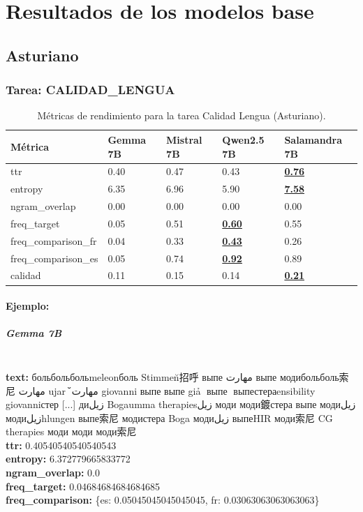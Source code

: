 \chapter{Resultados de los modelos base}

\section{Asturiano}

\subsection{Tarea: CALIDAD\_LENGUA}\label{tarea-calidad_lengua}
\begin{longtable}[]{@{}lllll@{}}
\toprule\noalign{}
Métrica & Gemma 7B & Mistral 7B & Qwen2.5 7B & Salamandra 7B \\
\midrule\noalign{}
\endhead
\bottomrule\noalign{}
\caption{Métricas de rendimiento para la tarea Calidad Lengua (Asturiano).}
\label{tab:metricas_calidad_lengua_Asturiano}
\endlastfoot
ttr & 0.40 & 0.47 & 0.43 & \textbf{\underline{0.76}} \\
entropy & 6.35 & 6.96 & 5.90 & \textbf{\underline{7.58}} \\
ngram\_overlap & 0.00 & 0.00 & 0.00 & 0.00 \\
freq\_target & 0.05 & 0.51 & \textbf{\underline{0.60}} & 0.55 \\
freq\_comparison\_fr & 0.04 & 0.33 & \textbf{\underline{0.43}} & 0.26 \\
freq\_comparison\_es & 0.05 & 0.74 & \textbf{\underline{0.92}} & 0.89 \\
calidad & 0.11 & 0.15 & 0.14 & \textbf{\underline{0.21}} \\
\end{longtable}

\subsubsection{Ejemplo:}

\paragraph{Gemma 7B}~\\
\textbf{text:} больбольбольmeleonболь Stimmen̆招呼 выпе مهارت выпе модибольболь索尼 مهارت ujar🥈 مهارت̆ giovanni выпе выпе giả🥈 выпе🥈 выпестераensibility giovanniстер [...] диزيل Bogaumma therapiesزيل моди моди鍍стера выпе модиزيل модиزيلhlungen выпе索尼 модистера Boga модиزيل выпеHIR моди索尼 CG therapies моди моди моди索尼\\
\textbf{ttr:} 0.40540540540540543\\
\textbf{entropy:} 6.372779665833772\\
\textbf{ngram\_overlap:} 0.0\\
\textbf{freq\_target:} 0.04684684684684685\\
\textbf{freq\_comparison:} \{\textquotesingle{}es\textquotesingle{}: 0.05045045045045045, \textquotesingle{}fr\textquotesingle{}: 0.03063063063063063\}

